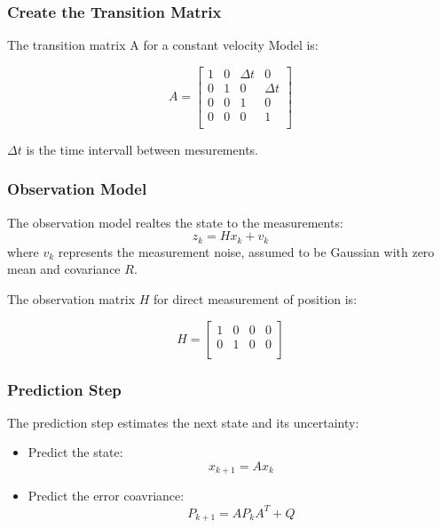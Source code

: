 \documentclass{beamer}
\begin{document}
\begin{frame}
    \frametitle{Create the Transition Matrix}
    The transition matrix A for a constant velocity Model is:

    \begin{equation*}
        A = \begin{bmatrix}
            1 & 0 & \Delta t & 0        \\
            0 & 1 & 0        & \Delta t \\
            0 & 0 & 1        & 0        \\
            0 & 0 & 0        & 1        \\
        \end{bmatrix}
    \end{equation*}

    \(\Delta t\) is the time intervall between mesurements.
\end{frame}

\begin{frame}
    \frametitle{Observation Model}
    The observation model realtes the state to the measurements:
    \begin{equation*}
        z_{k}=Hx_{k}+v_{k}
    \end{equation*}
    where \(v_{k}\) represents the measurement noise, assumed to be Gaussian with zero mean and
    covariance \(R\).

    The observation matrix \(H\) for direct measurement of position is:

    \begin{equation*}
        H = \begin{bmatrix}
            1 & 0 & 0 & 0 \\
            0 & 1 & 0 & 0 \\
        \end{bmatrix}
    \end{equation*}

\end{frame}

\begin{frame}
    \frametitle{Prediction Step}

    The prediction step estimates the next state and its uncertainty:

    \begin{itemize}
        \item Predict the state:
              \begin{equation}
                  x_{k+1}=Ax_{k}
              \end{equation}

        \item Predict the error coavriance:
              \begin{equation}
                  P_{k+1}=AP_{k}A^{T}+Q
              \end{equation}
    \end{itemize}
\end{frame}
\end{document}
